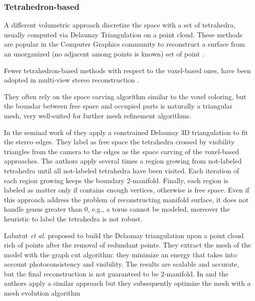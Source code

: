 \subsubsection{Tetrahedron-based}
A different volumetric approach discretize the space with a set of tetrahedra, usually computed via Delaunay Triangulation on a point cloud.
These methods are popular in the Computer Graphics community to reconstruct a surface from an unorganized (no adjacent among points is known) set of point \cite{amenta1999surface,amenta2001power,boissonnat1984geometric,dey2004provable,kolluri2004spectral}. 

Fewer tetrahedron-based methods with respect to the voxel-based ones, have been adopted in multi-view stereo reconstruction
\cite{faugeras_et_al_90,labatut2007efficient,salman2010surface,vu_et_al_2012,hiep2009towards,Pan_et_al09}.

They often rely on the space carving algorithm similar to the voxel coloring, but the boundar between free space and occupied parts is naturally a triangular mesh, very well-suited for further mesh refinement algorithms.

In the seminal work of \cite{faugeras_et_al_90} they apply a constrained Delaunay 3D triangulation to fit the stereo edges. They label  as free space the tetrahedra crossed by visibility triangles from the camera to the edges as the space carving of the voxel-based approaches. The authors apply several times a region growing from not-labeled tetrahedra  until all not-labeled tetrahedra have been visited. Each iteration of each region growing keeps the boundary 2-manifold. Finally, each region is labeled as matter only if contains enough vertices, otherwise is free space. 
Even if this approach address the problem of reconstructing manifold surface, it does not handle genus greater than 0, e.g., a torus cannot be modeled, moreover the heuristic to label the tetrahedra is not robust.

Labatut \emph{et al.} \cite{labatut2007efficient} proposed to build the Delaunay triangulation upon a point cloud rich of points after the removal of redundant points. 
They extract the mesh of the model with the graph cut algorithm: they minimize an energy that takes into account photoconsistency and visibility. The results are scalable and accurate, but the final reconstruction is not guaranteed to be 2-manifold.
In \cite{hiep2009towards} and \cite{vu_et_al_2012} the authors apply a similar approach but they subsequently optimize the mesh with a mesh evolution algorithm

